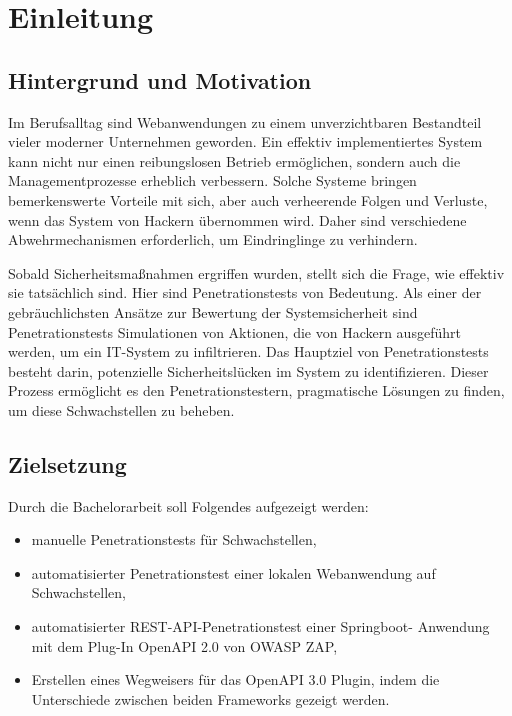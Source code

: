 \chapter{Einleitung}
\label{cha:Einleitung}

\section{Hintergrund und Motivation}

Im Berufsalltag sind Webanwendungen zu einem unverzichtbaren Bestandteil vieler moderner Unternehmen geworden. Ein effektiv implementiertes System kann nicht nur einen reibungslosen Betrieb ermöglichen, sondern auch die Managementprozesse erheblich verbessern. Solche Systeme bringen bemerkenswerte Vorteile mit sich, aber auch verheerende Folgen und Verluste, wenn das System von Hackern übernommen wird. Daher sind verschiedene Abwehrmechanismen erforderlich, um Eindringlinge zu verhindern.

Sobald Sicherheitsmaßnahmen ergriffen wurden, stellt sich die Frage, wie effektiv sie tatsächlich sind. Hier sind Penetrationstests von Bedeutung. Als einer der gebräuchlichsten Ansätze zur Bewertung der Systemsicherheit sind Penetrationstests Simulationen von Aktionen, die von Hackern ausgeführt werden, um ein IT-System zu infiltrieren. Das Hauptziel von Penetrationstests besteht darin, potenzielle Sicherheitslücken im System zu identifizieren. Dieser Prozess ermöglicht es den Penetrationstestern, pragmatische Lösungen zu finden, um diese Schwachstellen zu beheben.

\section{Zielsetzung}

Durch die Bachelorarbeit soll Folgendes aufgezeigt werden:

\begin{itemize}
	\item manuelle Penetrationstests für Schwachstellen,
	\item automatisierter Penetrationstest einer lokalen Webanwendung auf Schwachstellen,
	\item automatisierter REST-API-Penetrationstest einer Springboot- Anwendung mit dem Plug-In OpenAPI 2.0 von OWASP ZAP,
	\item Erstellen eines Wegweisers für das OpenAPI 3.0 Plugin, indem die Unterschiede zwischen beiden Frameworks gezeigt werden.\\
\end{itemize}

